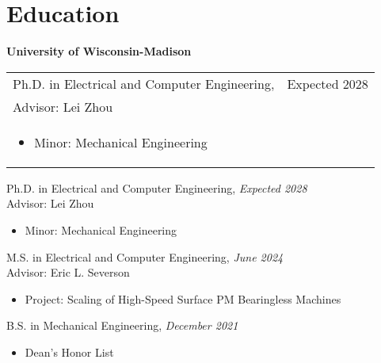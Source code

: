 \section{\sc Education}

{\bf University of Wisconsin-Madison}\\
\begin{tabular}{@{}p{4.5in}>{\raggedleft\arraybackslash}p{1in}}
    Ph.D. in Electrical and Computer Engineering,& Expected 2028\\
    Advisor: Lei Zhou & \\
    \begin{itemize}
        \item Minor: Mechanical Engineering
    \end{itemize} & \\
\end{tabular}


Ph.D. in Electrical and Computer Engineering, \textit{Expected 2028} \\
Advisor: Lei Zhou
\begin{itemize}
    \item Minor: Mechanical Engineering
\end{itemize}

M.S. in Electrical and Computer Engineering, \textit{June 2024} \\
Advisor: Eric L. Severson
\begin{itemize}
    \item Project: Scaling of High-Speed Surface PM Bearingless Machines
\end{itemize}

B.S. in Mechanical Engineering, \textit{December 2021}
\begin{itemize}
    \item Dean's Honor List
\end{itemize}
\endinput